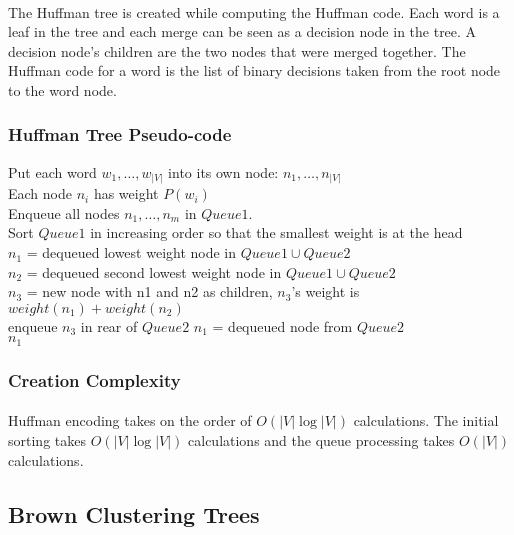 \paragraph{}
The Huffman tree is created while computing the Huffman code. Each word is a leaf in the tree and each merge can be seen as a decision node in the tree. A decision node's children are the two nodes that were merged together. The Huffman code for a word is the list of binary decisions taken from the root node to the word node.

\subsubsection{Huffman Tree Pseudo-code}

\begin{algorithm}[H]
\SetAlgoLined
Put each word $w_1,\dots,w_{|V|}$ into its own node: $n_1,\dots,n_{|V|}$
\\ Each node $n_i$ has weight $P(w_i)$
\\Enqueue all nodes $n_1,\dots,n_m$ in $Queue1$.
\\Sort $Queue1$ in increasing order so that the smallest weight is at the head
\\  {
	$n_1$ = dequeued lowest weight node in $Queue1 \cup Queue2$
	\\$n_2$ = dequeued second lowest weight node in $Queue1 \cup Queue2$
	\\$n_3$ = new node with n1 and n2 as children,  $n_3$'s weight is $weight(n_1)+weight(n_2)$
	\\enqueue $n_3$ in rear of $Queue2$
}
$n_1$ = dequeued node from $Queue2$
\\ \Return $n_1$
\end{algorithm}

\subsubsection{Creation Complexity}
\paragraph{}
Huffman encoding takes on the order of $O\left(|V| \log |V| \right)$ calculations. The initial sorting takes $O\left(|V| \log |V|\right)$ calculations and the queue processing takes $O(|V|)$ calculations.

\subsection{Brown Clustering Trees}
